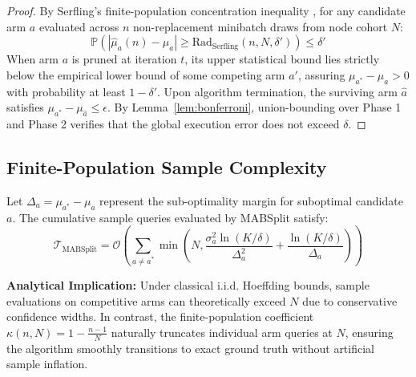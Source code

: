 \begin{proof}
By Serfling's finite-population concentration inequality \cite{serfling1974probability,bardenet2015concentration}, for any candidate arm $a$ evaluated across $n$ non-replacement minibatch draws from node cohort $N$:
\begin{equation}
\mathbb{P}\left(|\hat{\mu}_a(n) - \mu_a| \ge \text{Rad}_{\text{Serfling}}(n, N, \delta') \right) \le \delta'
\end{equation}
When arm $a$ is pruned at iteration $t$, its upper statistical bound lies strictly below the empirical lower bound of some competing arm $a'$, assuring $\mu_{a^*} - \mu_a > 0$ with probability at least $1 - \delta'$. Upon algorithm termination, the surviving arm $\hat{a}$ satisfies $\mu_{a^*} - \mu_{\hat{a}} \le \epsilon$. By Lemma~\ref{lem:bonferroni}, union-bounding over Phase 1 and Phase 2 verifies that the global execution error does not exceed $\delta$.
\end{proof}

\subsection{Finite-Population Sample Complexity}
\begin{corollary}
Let $\Delta_a = \mu_{a^*} - \mu_a$ represent the sub-optimality margin for suboptimal candidate $a$. The cumulative sample queries evaluated by MABSplit satisfy:
\begin{equation}
\mathcal{T}_{\text{MABSplit}} = \mathcal{O}\left( \sum_{a \neq a^*} \min\left( N, \frac{\sigma_a^2 \ln(K/\delta)}{\Delta_a^2} + \frac{\ln(K/\delta)}{\Delta_a} \right) \right)
\end{equation}
\end{corollary}
\noindent\textbf{Analytical Implication:} Under classical i.i.d. Hoeffding bounds, sample evaluations on competitive arms can theoretically exceed $N$ due to conservative confidence widths. In contrast, the finite-population coefficient $\kappa(n, N) = 1 - \frac{n-1}{N}$ naturally truncates individual arm queries at $N$, ensuring the algorithm smoothly transitions to exact ground truth without artificial sample inflation.
